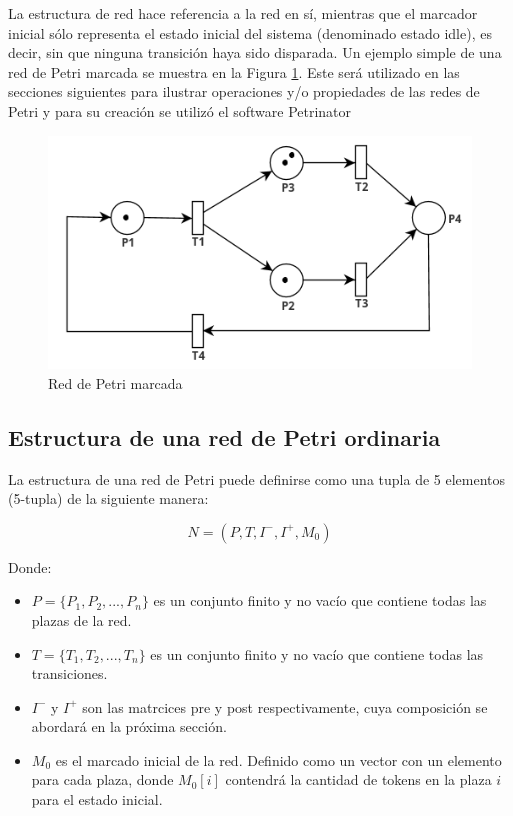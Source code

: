 La estructura de red hace referencia a la red en sí, mientras que el marcador inicial sólo representa el estado inicial del sistema (denominado estado idle), es decir, sin que ninguna transición haya sido disparada. Un ejemplo simple de una red de Petri marcada se muestra en la Figura \ref{fig:rdp_marcada}. Este será utilizado en las secciones siguientes para ilustrar operaciones y/o propiedades de las redes de Petri y para su creación se utilizó el software Petrinator \cite{petrinator}

\begin{figure}[H]
    \centering
    \includegraphics[width=0.6\linewidth]{images/rdp_marcada.png}
    \caption{Red de Petri marcada}
    \label{fig:rdp_marcada}
\end{figure}

\subsection{Estructura de una red de Petri ordinaria}
La estructura de una red de Petri puede definirse como una tupla de 5 elementos (5-tupla) \cite{falko} de la siguiente manera:

\begin{equation}
    N = (P, T, I^-, I^+, M_0)
\end{equation}

Donde:
\begin{itemize}
    \item $P = \{P_1, P_2, ..., P_n\}$ es un conjunto finito y no vacío que contiene todas las plazas de la red.
    \item $T = \{T_1, T_2, ..., T_n\}$ es un conjunto finito y no vacío que contiene todas las transiciones.
    \item $I^-$ y $I^+$ son las matrcices pre y post respectivamente, cuya composición se abordará en la próxima sección.
    \item $M_0$ es el marcado inicial de la red. Definido como un vector con un elemento para cada plaza, donde $M_0[i]$ contendrá la cantidad de tokens en la plaza $i$ para el estado inicial.
\end{itemize}

